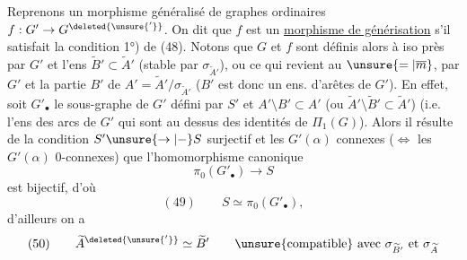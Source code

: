 Reprenons un morphisme généralisé de graphes ordinaires $f:G'\to G^{\deleted{\unsure{'}}}$. On dit que $f$ est un \uline{morphisme de générisation} s'il satisfait la condition 1°) de (48). Notons que $G$ et $f$ sont définis alors à iso près par $G'$ et l'ens $\widetilde B'\subset\widetilde A'$ (stable par $\sigma_{\widetilde A'}$), ou ce qui revient au $\unsure{=|\overline m}$, par $G'$ et la  partie $B'$ de $A'=\widetilde A'/\sigma_{\widetilde A'}$ ($B'$ est donc un ens. d'arêtes de $G'$). En effet, soit $G'_\bullet$ le sous-graphe de $G'$ défini par $S'$ et $A'\setminus B'\subset A'$ (ou $\widetilde A'\setminus\widetilde B'\subset\widetilde A'$) (i.e.  l'ens des  arcs de $G'$ qui sont au dessus des identités de $\Pi_1(G)$). Alors il résulte de la condition $S'\unsure{\to|{-}}S$ surjectif et les $G'(\alpha)$ connexes ($\Longleftrightarrow$ les $G'(\alpha)$ 0-connexes) que  l'homomorphisme canonique
\[
\pi_0(G'_\bullet)\longrightarrow S
\]
est bijectif, d'où
\[
(49)\qquad S\simeq\pi_0(G'_\bullet),
\]
d'ailleurs on a
\[
(50)\qquad\widetilde A^{\deleted{\unsure{'}}}\simeq\widetilde B'\qquad\unsure{\text{compatible}}\text{ avec }\sigma_{\widetilde B'}\text{ et }\sigma_{\widetilde A}
\]
